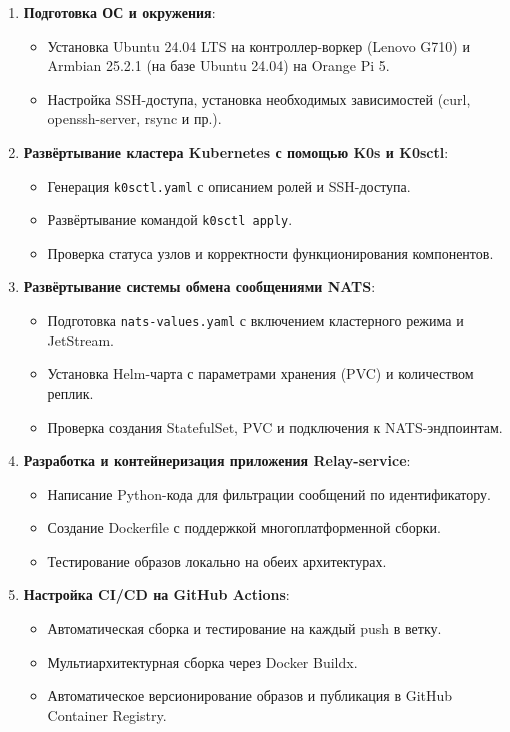 \documentclass[14pt, a4paper]{extreport}
\begin{document}
\begin{enumerate}
\item \textbf{Подготовка ОС и окружения}:
\begin{itemize}
\item Установка Ubuntu 24.04 LTS на контроллер-воркер (Lenovo G710) и Armbian 25.2.1 (на базе Ubuntu 24.04) на Orange Pi 5.
\item Настройка SSH-доступа, установка необходимых зависимостей (curl, openssh-server, rsync и пр.).
\end{itemize}

\item \textbf{Развёртывание кластера Kubernetes с помощью K0s и K0sctl}:
\begin{itemize}
\item Генерация \texttt{k0sctl.yaml} с описанием ролей и SSH-доступа.
\item Развёртывание командой \texttt{k0sctl apply}.
\item Проверка статуса узлов и корректности функционирования компонентов.
\end{itemize}

\item \textbf{Развёртывание системы обмена сообщениями NATS}:
\begin{itemize}
\item Подготовка \texttt{nats-values.yaml} с включением кластерного режима и JetStream.
\item Установка Helm-чарта с параметрами хранения (PVC) и количеством реплик.
\item Проверка создания StatefulSet, PVC и подключения к NATS-эндпоинтам.
\end{itemize}

\item \textbf{Разработка и контейнеризация приложения Relay-service}:
\begin{itemize}
\item Написание Python-кода для фильтрации сообщений по идентификатору.
\item Создание Dockerfile с поддержкой многоплатформенной сборки.
\item Тестирование образов локально на обеих архитектурах.
\end{itemize}

\item \textbf{Настройка CI/CD на GitHub Actions}:
\begin{itemize}
\item Автоматическая сборка и тестирование на каждый push в ветку.
\item Мультиархитектурная сборка через Docker Buildx.
\item Автоматическое версионирование образов и публикация в GitHub Container Registry.
\end{itemize}


\end{enumerate}
\end{document}
